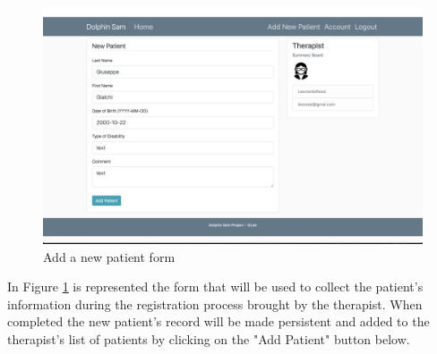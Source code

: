 \begin{figure}[h!]
	\includegraphics[width=\textwidth]{images/UX/website/6-addNewPatient}
	\caption{Add a new patient form}
	\label{fig:webAddPat}
\end{figure}
\pagebreak
In Figure  \ref{fig:webAddPat} is represented the form that will be used to collect the patient's information during the registration process brought by the therapist. When completed the new patient's record will be made persistent and added to the therapist's list of patients by clicking on the "Add Patient" button below.
